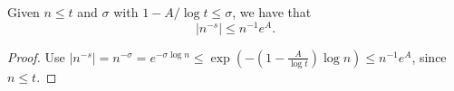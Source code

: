 \begin{lemma}
\label{ZetaBnd_aux2}
\leanok
Given $n ≤ t$ and $\sigma$ with $1-A/\log t \le \sigma$, we have
  that
  $$
  |n^{-s}| \le n^{-1} e^A.
  $$
\end{lemma}
\begin{proof}
\leanok
Use $|n^{-s}| = n^{-\sigma}
  = e^{-\sigma \log n}
  \le
  \exp(-\left(1-\frac{A}{\log t}\right)\log n)
  \le
  n^{-1} e^A$,
  since $n\le t$.
\end{proof}
